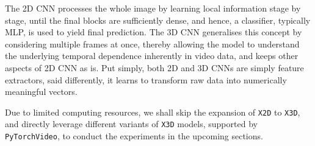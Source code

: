 The 2D CNN processes the whole image by learning local information stage by stage, until the final blocks are sufficiently dense,
and hence, a classifier, typically MLP, is used to yield final prediction.
The 3D CNN generalises this concept by considering multiple frames at once, thereby allowing the model to understand the underlying temporal dependence inherently in video data, and keeps other aspects of 2D CNN as is.
Put simply, both 2D and 3D CNNs are simply feature extractors, said differently, it learns to transform raw data into numerically meaningful vectors.

Due to limited computing resources, we shall skip the expansion of \texttt{X2D} to \texttt{X3D}, and directly leverage different variants of \texttt{X3D} models, supported by \texttt{PyTorchVideo}, to conduct the experiments in the upcoming sections.


